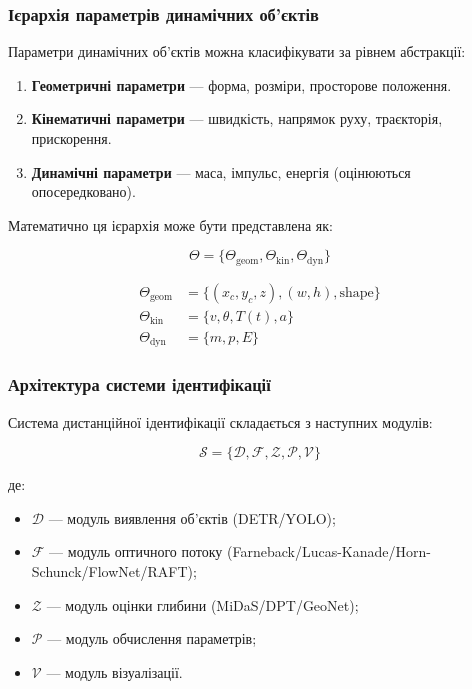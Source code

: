 \documentclass[14pt, a4paper]{extarticle}
\numberwithin{equation}{section}
\begin{document}
\subsubsection{Ієрархія параметрів динамічних об'єктів}

Параметри динамічних об'єктів можна класифікувати за рівнем абстракції:

\begin{enumerate}
    \item \textbf{Геометричні параметри} — форма, розміри, просторове положення.
    \item \textbf{Кінематичні параметри} — швидкість, напрямок руху, траєкторія, прискорення.
    \item \textbf{Динамічні параметри} — маса, імпульс, енергія (оцінюються опосередковано).
\end{enumerate}

Математично ця ієрархія може бути представлена як:

\begin{equation}
\Theta = \{\Theta_{\text{geom}}, \Theta_{\text{kin}}, \Theta_{\text{dyn}}\} \tag{2}
\end{equation}

\begin{align}
\Theta_{\text{geom}} &= \{(x_c, y_c, z), (w, h), \text{shape}\} \tag{3} \\
\Theta_{\text{kin}} &= \{v, \theta, T(t), a\} \tag{4} \\
\Theta_{\text{dyn}} &= \{m, p, E\} \tag{5}
\end{align}

\subsubsection{Архітектура системи ідентифікації}

Система дистанційної ідентифікації складається з наступних модулів:

\begin{equation}
\mathcal{S} = \{\mathcal{D}, \mathcal{F}, \mathcal{Z}, \mathcal{P}, \mathcal{V}\} \tag{6}
\end{equation}

де:
\begin{itemize}
\item $\mathcal{D}$ — модуль виявлення об'єктів (DETR/YOLO);
\item $\mathcal{F}$ — модуль оптичного потоку (Farneback/Lucas-Kanade/Horn-Schunck/FlowNet/RAFT);
\item $\mathcal{Z}$ — модуль оцінки глибини (MiDaS/DPT/GeoNet);
\item $\mathcal{P}$ — модуль обчислення параметрів;
\item $\mathcal{V}$ — модуль візуалізації.
\end{itemize}
\end{document}
